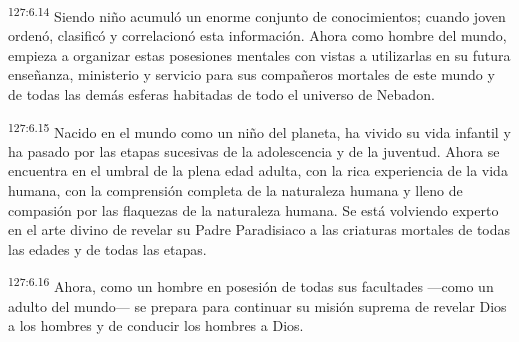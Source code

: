 \par
\textsuperscript{127:6.14} Siendo niño acumuló un enorme conjunto de conocimientos; cuando joven ordenó, clasificó y correlacionó esta información. Ahora como hombre del mundo, empieza a organizar estas posesiones mentales con vistas a utilizarlas en su futura enseñanza, ministerio y servicio para sus compañeros mortales de este mundo y de todas las demás esferas habitadas de todo el universo de Nebadon.

\par
\textsuperscript{127:6.15} Nacido en el mundo como un niño del planeta, ha vivido su vida infantil y ha pasado por las etapas sucesivas de la adolescencia y de la juventud. Ahora se encuentra en el umbral de la plena edad adulta, con la rica experiencia de la vida humana, con la comprensión completa de la naturaleza humana y lleno de compasión por las flaquezas de la naturaleza humana. Se está volviendo experto en el arte divino de revelar su Padre Paradisiaco a las criaturas mortales de todas las edades y de todas las etapas.

\par
\textsuperscript{127:6.16} Ahora, como un hombre en posesión de todas sus facultades ---como un adulto del mundo--- se prepara para continuar su misión suprema de revelar Dios a los hombres y de conducir los hombres a Dios.